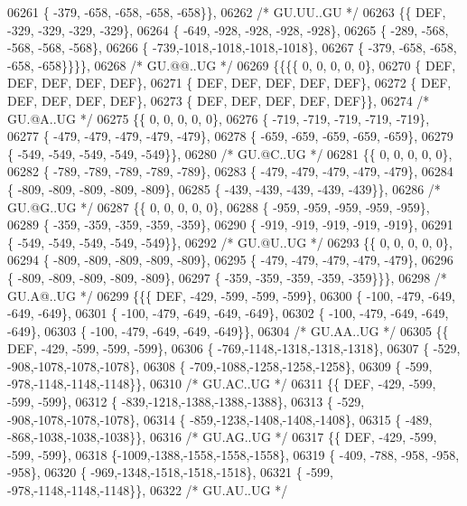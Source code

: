 \begin{DoxyCode}
06261 \{ -379, -658, -658, -658, -658\}\},
06262 \textcolor{comment}{/* GU.UU..GU */}
06263 \{\{  DEF, -329, -329, -329, -329\},
06264 \{ -649, -928, -928, -928, -928\},
06265 \{ -289, -568, -568, -568, -568\},
06266 \{ -739,-1018,-1018,-1018,-1018\},
06267 \{ -379, -658, -658, -658, -658\}\}\}\},
06268 \textcolor{comment}{/* GU.@@..UG */}
06269 \{\{\{\{    0,    0,    0,    0,    0\},
06270 \{  DEF,  DEF,  DEF,  DEF,  DEF\},
06271 \{  DEF,  DEF,  DEF,  DEF,  DEF\},
06272 \{  DEF,  DEF,  DEF,  DEF,  DEF\},
06273 \{  DEF,  DEF,  DEF,  DEF,  DEF\}\},
06274 \textcolor{comment}{/* GU.@A..UG */}
06275 \{\{    0,    0,    0,    0,    0\},
06276 \{ -719, -719, -719, -719, -719\},
06277 \{ -479, -479, -479, -479, -479\},
06278 \{ -659, -659, -659, -659, -659\},
06279 \{ -549, -549, -549, -549, -549\}\},
06280 \textcolor{comment}{/* GU.@C..UG */}
06281 \{\{    0,    0,    0,    0,    0\},
06282 \{ -789, -789, -789, -789, -789\},
06283 \{ -479, -479, -479, -479, -479\},
06284 \{ -809, -809, -809, -809, -809\},
06285 \{ -439, -439, -439, -439, -439\}\},
06286 \textcolor{comment}{/* GU.@G..UG */}
06287 \{\{    0,    0,    0,    0,    0\},
06288 \{ -959, -959, -959, -959, -959\},
06289 \{ -359, -359, -359, -359, -359\},
06290 \{ -919, -919, -919, -919, -919\},
06291 \{ -549, -549, -549, -549, -549\}\},
06292 \textcolor{comment}{/* GU.@U..UG */}
06293 \{\{    0,    0,    0,    0,    0\},
06294 \{ -809, -809, -809, -809, -809\},
06295 \{ -479, -479, -479, -479, -479\},
06296 \{ -809, -809, -809, -809, -809\},
06297 \{ -359, -359, -359, -359, -359\}\}\},
06298 \textcolor{comment}{/* GU.A@..UG */}
06299 \{\{\{  DEF, -429, -599, -599, -599\},
06300 \{ -100, -479, -649, -649, -649\},
06301 \{ -100, -479, -649, -649, -649\},
06302 \{ -100, -479, -649, -649, -649\},
06303 \{ -100, -479, -649, -649, -649\}\},
06304 \textcolor{comment}{/* GU.AA..UG */}
06305 \{\{  DEF, -429, -599, -599, -599\},
06306 \{ -769,-1148,-1318,-1318,-1318\},
06307 \{ -529, -908,-1078,-1078,-1078\},
06308 \{ -709,-1088,-1258,-1258,-1258\},
06309 \{ -599, -978,-1148,-1148,-1148\}\},
06310 \textcolor{comment}{/* GU.AC..UG */}
06311 \{\{  DEF, -429, -599, -599, -599\},
06312 \{ -839,-1218,-1388,-1388,-1388\},
06313 \{ -529, -908,-1078,-1078,-1078\},
06314 \{ -859,-1238,-1408,-1408,-1408\},
06315 \{ -489, -868,-1038,-1038,-1038\}\},
06316 \textcolor{comment}{/* GU.AG..UG */}
06317 \{\{  DEF, -429, -599, -599, -599\},
06318 \{-1009,-1388,-1558,-1558,-1558\},
06319 \{ -409, -788, -958, -958, -958\},
06320 \{ -969,-1348,-1518,-1518,-1518\},
06321 \{ -599, -978,-1148,-1148,-1148\}\},
06322 \textcolor{comment}{/* GU.AU..UG */}

\end{DoxyCode}
